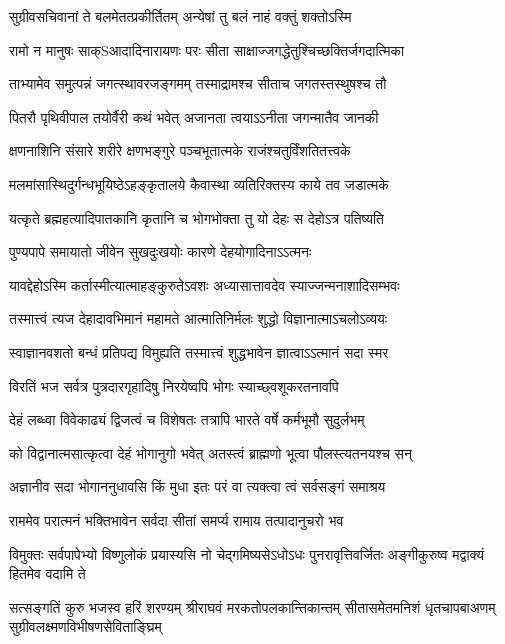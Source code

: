 \twolineshloka
{सुग्रीवसचिवानां ते बलमेतत्प्रकीर्तितम्}
{अन्येषां तु बलं नाहं वक्तुं शक्तोऽस्मि} %

\twolineshloka
{रामो न मानुषः साक्Sआदादिनारायणः परः}
{सीता साक्षाज्जगद्धेतुश्चिच्छक्तिर्जगदात्मिका} %

\twolineshloka
{ताभ्यामेव समुत्पन्नं जगत्स्थावरजङ्गमम्}
{तस्माद्रामश्च सीताच जगतस्तस्थुषश्च तौ} %

\twolineshloka
{पितरौ पृथिवीपाल तयोर्वैरी कथं भवेत्}
{अजानता त्वयाऽऽनीता जगन्मातैव जानकी} %

\twolineshloka
{क्षणनाशिनि संसारे शरीरे क्षणभङ्गुरे}
{पञ्चभूतात्मके राजंश्चतुर्विंशतितत्त्वके} %

\twolineshloka
{मलमांसास्थिदुर्गन्धभूयिष्ठेऽहङ्कृतालये}
{कैवास्था व्यतिरिक्तस्य काये तव जडात्मके} %

\twolineshloka
{यत्कृते ब्रह्महत्यादिपातकानि कृतानि च}
{भोगभोक्ता तु यो देहः स देहोऽत्र पतिष्यति} %

\twolineshloka
{पुण्यपापे समायातो जीवेन सुखदुःखयोः}
{कारणे देहयोगादिनाऽऽत्मनः} %

\twolineshloka
{यावद्देहोऽस्मि कर्तास्मीत्यात्माहङ्कुरुतेऽवशः}
{अध्यासात्तावदेव स्याज्जन्मनाशादिसम्भवः} %

\twolineshloka
{तस्मात्त्वं त्यज देहादावभिमानं महामते}
{आत्मातिनिर्मलः शुद्धो विज्ञानात्माऽचलोऽव्ययः} %

\twolineshloka
{स्वाज्ञानवशतो बन्धं प्रतिपद्य विमुह्यति}
{तस्मात्त्वं शुद्धभावेन ज्ञात्वाऽऽत्मानं सदा स्मर} %

\twolineshloka
{विरतिं भज सर्वत्र पुत्रदारगृहादिषु}
{निरयेष्वपि भोगः स्याच्छ्वशूकरतनावपि} %

\twolineshloka
{देहं लब्ध्वा विवेकाढ्यं द्विजत्वं च विशेषतः}
{तत्रापि भारते वर्षे कर्मभूमौ सुदुर्लभम्} %

\twolineshloka
{को विद्वानात्मसात्कृत्वा देहं भोगानुगो भवेत्}
{अतस्त्वं ब्राह्मणो भूत्वा पौलस्त्यतनयश्च सन्} %

\twolineshloka
{अज्ञानीव सदा भोगाननुधावसि किं मुधा}
{इतः परं वा त्यक्त्वा त्वं सर्वसङ्गं समाश्रय} %

\twolineshloka
{राममेव परात्मनं भक्तिभावेन सर्वदा}
{सीतां समर्प्य रामाय तत्पादानुचरो भव} %

\threelineshloka
{विमुक्तः सर्वपापेभ्यो विष्णुलोकं प्रयास्यसि}
{नो चेद्गमिष्यसेऽधोऽधः पुनरावृत्तिवर्जितः}
{अङ्गीकुरुष्व मद्वाक्यं हितमेव वदामि ते} %

\fourlineindentedshloka
{सत्सङ्गतिं कुरु भजस्व हरिं शरण्यम्}
{श्रीराघवं मरकतोपलकान्तिकान्तम्}
{सीतासमेतमनिशं धृतचापबाअणम्}
{सुग्रीवलक्ष्मणविभीषणसेविताङ्घ्रिम्} %


